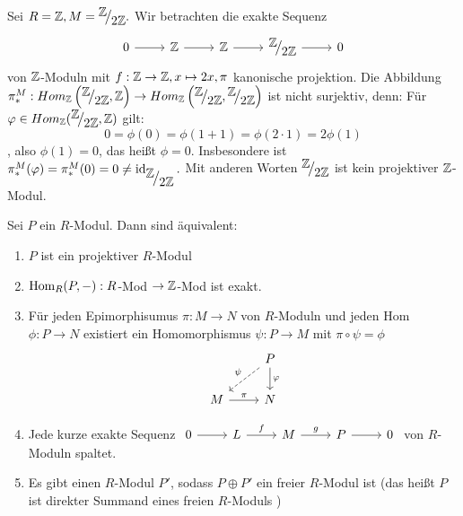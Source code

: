 \begin{bsp}
	Sei $ R = \Z  ,M = \QR{\Z}{2\Z}. $ Wir betrachten die exakte Sequenz  \\ $$\begin{tikzcd}
	0  \arrow{r} & \Z \arrow{r} & \Z \arrow{r} & \QR{\Z}{2\Z} \arrow{r} & 0
	\end{tikzcd}$$ von $\mathbb{Z}$-Moduln  mit $f: \mathbb{Z} \to \mathbb{Z}, x \mapsto 2x, \pi $ kanonische projektion. Die Abbildung $ \pi_{*}^{M}: Hom_{\Z}\left(\QR{\Z}{2\Z}, \Z\right) \to Hom_{\Z}\left(\QR{\Z}{2\Z},\QR{\Z}{2\Z}\right) $ ist nicht surjektiv, denn:  Für $ \phi \in Hom_{\Z}(\QR{\Z}{2\Z}, \Z) $ gilt: 
	$$0 = \phi(0) = \phi( 1 +1) = \phi(2\cdot 1) = 2\phi(1)$$, also $ \phi(1)= 0$, das heißt $\phi = 0$. Insbesondere ist $\pi_{*}^{M}(\phi) = \pi_{*}^{M}(0) =0 \neq \id_{\QR{\Z}{2\Z}} . $ Mit anderen Worten $\QR{\Z}{2\Z}$ ist kein projektiver $\mathbb{Z}$-Modul. 
\end{bsp}
\begin{sa}
	Sei $P$ ein $R$-Modul. Dann sind äquivalent:
	\begin{enumerate} [label= \roman*)]
		\item $P$ ist ein projektiver $R$-Modul 
		\item $\operatorname{Hom}_R(P,-): R$-Mod $\to \mathbb{Z}$-Mod ist exakt.
		\item Für jeden Epimorphisumus $ \pi: M \to N $ von $R$-Moduln und jeden Hom $ \phi: P \to N $ existiert ein Homomorphismus $\psi: P \to M $ mit $ \pi \circ \psi = \phi$
		$$\begin{tikzcd}
		& P \arrow[swap, dashed]{dl}{\psi} \arrow{d}{\phi} \\
		M \arrow{r}{\pi} & N
		\end{tikzcd}$$
		\item Jede kurze exakte Sequenz $\begin{tikzcd}
		0  \arrow{r} & L \arrow{r}{f} & M \arrow{r}{g} & P \arrow{r} & 0
		\end{tikzcd} $ von $R$-Moduln spaltet.
		\item Es gibt einen $R$-Modul $P'$, sodass $ P \oplus P' $ ein freier $R$-Modul ist (das heißt $P$ ist direkter Summand eines freien $R$-Moduls )
	\end{enumerate}
\end{sa}
